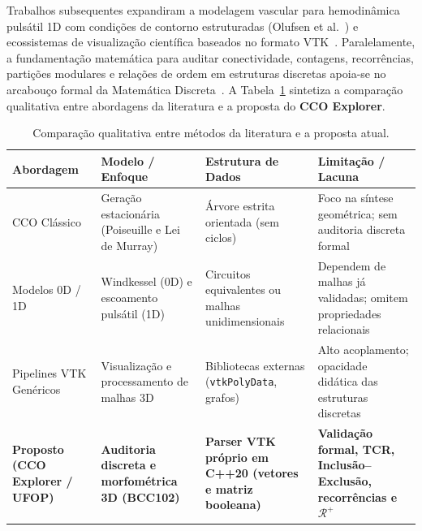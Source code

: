 \documentclass[11pt, a4paper]{article}
\begin{document}
Trabalhos subsequentes expandiram a modelagem vascular para hemodinâmica pulsátil 1D com condições de contorno estruturadas (Olufsen et al.~\cite{olufsen2000}) e ecossistemas de visualização científica baseados no formato VTK~\cite{vtkformat}. Paralelamente, a fundamentação matemática para auditar conectividade, contagens, recorrências, partições modulares e relações de ordem em estruturas discretas apoia-se no arcabouço formal da Matemática Discreta~\cite{rosen2019, scheinerman2011}. A Tabela~\ref{tab:relacionados} sintetiza a comparação qualitativa entre abordagens da literatura e a proposta do \textbf{CCO Explorer}.

\begin{table}[htbp]
  \centering
  \small
  \caption{Comparação qualitativa entre métodos da literatura e a proposta atual.}
  \label{tab:relacionados}
  \begin{tabularx}{\textwidth}{>{\raggedright\arraybackslash}p{3.4cm} >{\raggedright\arraybackslash}X >{\raggedright\arraybackslash}X >{\raggedright\arraybackslash}X}
    \toprule
    \textbf{Abordagem} & \textbf{Modelo / Enfoque} & \textbf{Estrutura de Dados} & \textbf{Limitação / Lacuna} \\
    \midrule
    CCO Clássico~\cite{schreiner1993, karch1999cco} & Geração estacionária (Poiseuille e Lei de Murray) & Árvore estrita orientada (sem ciclos) & Foco na síntese geométrica; sem auditoria discreta formal \\
    Modelos 0D / 1D~\cite{olufsen2000} & Windkessel (0D) e escoamento pulsátil (1D) & Circuitos equivalentes ou malhas unidimensionais & Dependem de malhas já validadas; omitem propriedades relacionais \\
    Pipelines VTK Genéricos~\cite{vtkformat} & Visualização e processamento de malhas 3D & Bibliotecas externas (\texttt{vtkPolyData}, grafos) & Alto acoplamento; opacidade didática das estruturas discretas \\
    \textbf{Proposto (CCO Explorer / UFOP)} & \textbf{Auditoria discreta e morfométrica 3D (BCC102)} & \textbf{Parser VTK próprio em C++20 (vetores e matriz booleana)} & \textbf{Validação formal, TCR, Inclusão--Exclusão, recorrências e $\mathcal{R}^+$} \\
    \bottomrule
  \end{tabularx}
\end{table}

\end{document}
